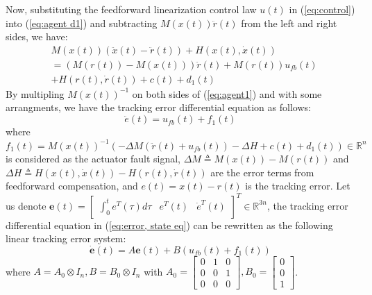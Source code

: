 \documentclass{ieeeaccess}
\newtheorem{remark}{Remark}
\begin{document}
Now, substituting the feedforward linearization control law $u(t)$ in (\ref{eq:control}) into (\ref{eq:agent d1}) and subtracting $M(x(t))\ddot{r}(t)$ from the left and right sides, we have:
\begin{equation} \label{eq:agent1}
    \begin{split}
        & M(x(t))(\ddot{x}(t)-\ddot{r}(t)) + H(x(t),\dot{x}(t)) \\
        & =(M(r(t))-M(x(t)))\ddot{r}(t) + M(r(t))u_{fb}(t) \\
        & + H(r(t),\dot{r}(t)) + c(t) + d_1(t)
    \end{split}
\end{equation}
By multipling $M(x(t))^{-1}$ on both sides of (\ref{eq:agent1}) and with some arrangments, we have the tracking error differential equation as follows:
\begin{equation} \label{eq:error, state eq}
    \ddot{e}(t) = u_{fb}(t) + f_1(t)
\end{equation}
where $f_1(t) = M(x(t))^{-1}(-\Delta M (\ddot{r}(t)+u_{fb}(t)) -\Delta H + c(t) + d_1(t))\in\mathbb{R}^n$ is considered as the actuator fault signal, $\Delta M \triangleq M(x(t)) - M(r(t))$ and $ \Delta H \triangleq H(x(t),\dot{x}(t)) - H(r(t),\dot{r}(t))$ are the error terms from feedforward compensation, and $e(t)= x(t)-r(t)$ is the tracking error.
Let us denote $\pmb{e}(t)=\begin{bmatrix}
    \int_{0}^{t}e^T(\tau)d\tau & e^T(t) & \dot{e}^T(t)
\end{bmatrix}^T\in\mathbb{R}^{3n}$, the tracking error differential equation in (\ref{eq:error, state eq}) can be rewritten as the following linear tracking error system:
\begin{equation} \label{eq:linear f1}
    \dot{\pmb{e}}(t)=A\pmb{e}(t)+B(u_{fb}(t)+f_1(t))
\end{equation}
where $ A = A_0\otimes I_n, B = B_0\otimes I_n$
with $A_0 = \begin{bmatrix}
    0 & 1 & 0 \\ 0 & 0 & 1 \\ 0 & 0 & 0
\end{bmatrix}, B_0 = \begin{bmatrix}
0 \\ 0 \\ 1
\end{bmatrix}$. 
\end{document}
